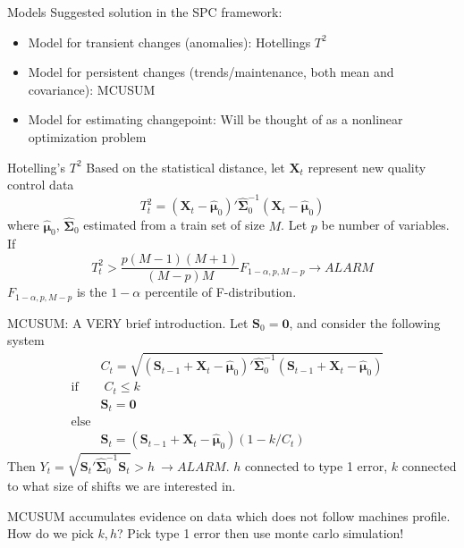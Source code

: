 \documentclass[11pt]{beamer}
\begin{document}
\begin{frame}{Models}
Suggested solution in the SPC framework: \\
\begin{itemize}
\item Model for transient changes (anomalies): Hotellings $T^2$ 
\item Model for persistent changes (trends/maintenance, both mean and covariance): MCUSUM
\item Model for estimating changepoint: Will be thought of as a nonlinear optimization problem
\end{itemize}
\end{frame}

\begin{frame}{Hotelling's $T^2$}
Based on the statistical distance, let $\mathbf{X}_t$ represent new quality control data
$$
T^2_{t} = (\mathbf{X}_t-\hat{\boldsymbol{\mu}}_0)'\widehat{\boldsymbol{\Sigma}}^{-1}_0(\mathbf{X}_t-\hat{\boldsymbol{\mu}}_0)
$$ 
where $\hat{\boldsymbol{\mu}}_0$, $\widehat{\boldsymbol{\Sigma}}_0$ estimated from a train set of size $M$. Let $p$ be number of variables. If
$$
 T^2_{t} > \frac{p(M-1)(M+1)}{(M-p)M} F_{1-\alpha,p,M-p} \rightarrow ALARM
$$
$F_{1-\alpha,p,M-p}$ is the $1-\alpha$ percentile of F-distribution. 
\end{frame}

\begin{frame}{MCUSUM: A VERY brief introduction. }
Let $\mathbf{S}_0=\mathbf{0}$, and consider the following system
\begin{align*}
&C_t=\sqrt{(\mathbf{S}_{t-1}+\mathbf{X}_t-\hat{\boldsymbol{\mu}}_0)'\widehat{\boldsymbol{\Sigma}}^{-1}_0
(\mathbf{S}_{t-1}+\mathbf{X}_t-\hat{\boldsymbol{\mu}}_0)} &\\
\text{if} &\; C_t \leq k &\\
&\mathbf{S}_t = \mathbf{0}& \\
\text{else} &&\\
&\mathbf{S}_t = (\mathbf{S}_{t-1}+\mathbf{X}_t-\hat{\boldsymbol{\mu}}_0)(1-k/C_t)&
\end{align*}
Then $Y_t=\sqrt{\mathbf{S}_t'\widehat{\boldsymbol{\Sigma}}^{-1}_0 \mathbf{S}_t}>h \: \rightarrow ALARM$. $h$ connected to type 1 error, $k$ connected to what size of shifts we are interested in.
 
MCUSUM accumulates evidence on data which does not follow machines profile.
 How do we pick $k,h$? Pick type 1 error then use monte carlo simulation!
\end{frame}
\end{document}
